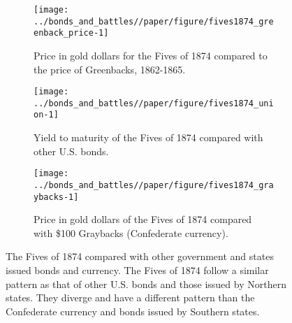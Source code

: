 \begin{figure}[!htpb]
  \begin{subfigure}[b]{0.45\linewidth}
    \texttt{[image: ../bonds\_and\_battles//paper/figure/fives1874\_greenback\_price-1]}
  \caption{Price in gold dollars for the Fives of 1874 compared to the price of Greenbacks, 1862-1865.}
  \label{bonds:fig:fives1874_greenbacks}
\end{subfigure}%
\hspace{0.1\linewidth}%
\begin{subfigure}[b]{0.45\linewidth}
    \texttt{[image: ../bonds\_and\_battles//paper/figure/fives1874\_union-1]}
    \caption{Yield to maturity of the Fives of 1874 compared with other U.S. bonds.}
  \label{bonds:fig:fives1874_union}
\end{subfigure}


\begin{subfigure}[b]{0.45\linewidth}
  \texttt{[image: ../bonds\_and\_battles//paper/figure/fives1874\_graybacks-1]}
\caption{Price in gold dollars of the Fives of 1874 compared with \$100 Graybacks (Confederate currency).}
\label{bonds:fig:fives1874_grayback}
\end{subfigure}
\caption[The Fives of 1874 compared with other government and states issued bonds and currency.]{The Fives of 1874 compared with other government and states issued bonds and currency.
  The Fives of 1874 follow a similar pattern as that of other U.S. bonds and those issued by Northern states.
  They diverge and have a different pattern than the Confederate currency and bonds issued by Southern states.
}
\label{bonds:fig:fives1874_compared}
\end{figure}



